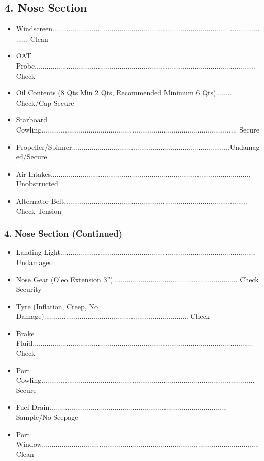 \documentclass[a4paper]{article}
\newenvironment{checklist}{
  \begin{itemize}[leftmargin=*, align=left]
    \setlength{\itemsep}{2pt}
    \setlength{\parskip}{0pt}
    \setlength{\parsep}{0pt}
}{
  \end{itemize}
}
\begin{document}
\subsection*{4. Nose Section}
\begin{checklist}
\item Windscreen............................................................................................................... Clean
\item OAT Probe................................................................................................................ Check
\item Oil Contents (8 Qts Min 2 Qts, Recommended Minimum 6 Qts)......... Check/Cap Secure
\item Starboard Cowling................................................................................................... Secure
\item Propeller/Spinner................................................................................Undamaged/Secure
\item Air Intakes..................................................................................................... Unobstructed
\item Alternator Belt............................................................................................. Check Tension
\end{checklist}

\subsubsection*{4. Nose Section (Continued)}
\begin{checklist}
\item Landing Light................................................................................................... Undamaged
\item Nose Gear (Oleo Extension 3\textonequarter”)............................................................... Check Security
\item Tyre (Inflation, Creep, No Damage)......................................................................... Check
\item Brake Fluid............................................................................................................... Check
\item Port Cowling............................................................................................................ Secure
\item Fuel Drain.......................................................................................... Sample/No Seepage
\item Port Window.............................................................................................................. Clean
\end{checklist}
\end{document}
